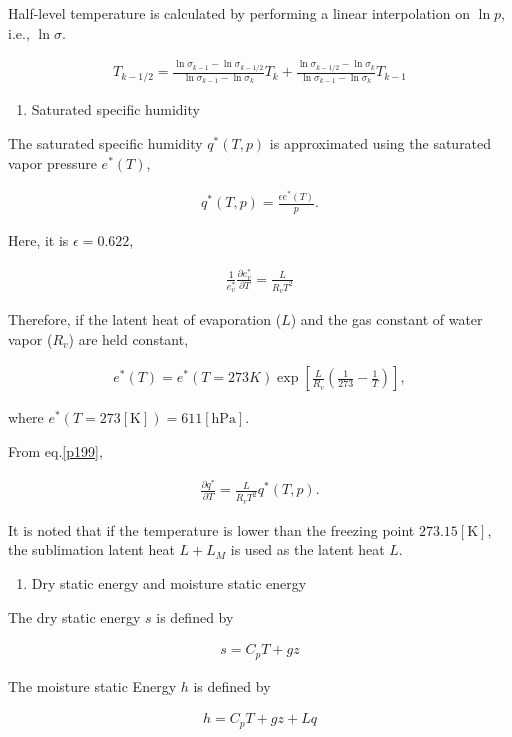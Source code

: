 Half-level temperature is calculated by performing a linear interpolation on \(\ln p\), i.e., \(\ln \sigma\).

\begin{eqnarray}
  T_{k-1/2} = \frac{\ln \sigma_{k-1} - \ln \sigma_{k-1/2}}
                   {\ln \sigma_{k-1} - \ln \sigma_k      } T_k
            + \frac{\ln \sigma_{k-1/2} - \ln \sigma_k}
                   {\ln \sigma_{k-1} - \ln \sigma_k      } T_{k-1}
\end{eqnarray}

\begin{enumerate}
\def\labelenumi{\arabic{enumi}.}
\setcounter{enumi}{4}
\tightlist
\item
  Saturated specific humidity
\end{enumerate}

The saturated specific humidity \(q^{*}(T,p)\) is approximated using the saturated vapor pressure \(e^{*}(T)\),

\begin{eqnarray}
q^{*}(T,p) = \frac{\epsilon e^{*}(T)}{p} .
\end{eqnarray}

Here, it is \(\epsilon=0.622\),

\begin{eqnarray}
\frac{1}{e^{*}_v} \frac{\partial{e^{*}_v}}{\partial {T}} = \frac{L}{R_v T^2} \label{p199}
\end{eqnarray}

Therefore, if the latent heat of evaporation (\(L\)) and the gas constant of water vapor (\(R_v\)) are held constant,

\begin{eqnarray}
  e^{*}(T) = e^{*}(T=273{K})
                      \exp \left[ \frac{L}{R_v}
                            \left( \frac{1}{273} - \frac{1}{T} \right)
                       \right] ,
\end{eqnarray}

where \(e^{*}(T=273 \mathrm{[K]}) = 611 \mathrm{[hPa]}\).

From eq.\ref{p199},

\begin{eqnarray}
\frac{\partial{q^{*}}}{\partial {T}} = \frac{L}{R_v T^2} q^{*}(T,p) .
\end{eqnarray}

It is noted that if the temperature is lower than the freezing point \(273.15 \mathrm{[K]}\), the sublimation latent heat \(L+L_M\) is used as the latent heat \(L\).

\begin{enumerate}
\def\labelenumi{\arabic{enumi}.}
\setcounter{enumi}{5}
\tightlist
\item
  Dry static energy and moisture static energy
\end{enumerate}

The dry static energy \(s\) is defined by

\begin{eqnarray}
  s = C_p T + g z
\end{eqnarray}

The moisture static Energy \(h\) is defined by

\begin{eqnarray}
  h = C_p T + g z + L q
\end{eqnarray}
